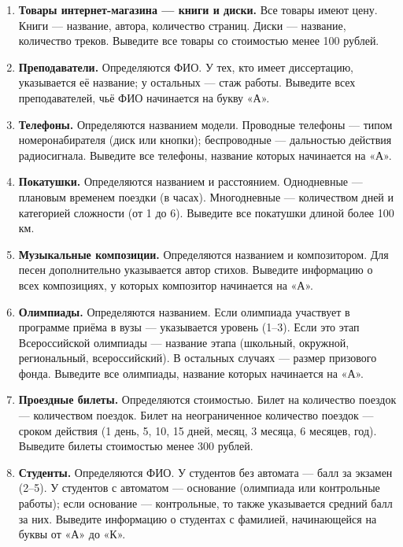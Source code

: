 \begin{enumerate}
    \item \textbf{Товары интернет-магазина — книги и диски.}  
    Все товары имеют цену. Книги — название, автора, количество страниц. Диски — название, количество треков.  
    Выведите все товары со стоимостью менее 100 рублей.

    \item \textbf{Преподаватели.}  
    Определяются ФИО. У тех, кто имеет диссертацию, указывается её название; у остальных — стаж работы.  
    Выведите всех преподавателей, чьё ФИО начинается на букву «А».

    \item \textbf{Телефоны.}  
    Определяются названием модели. Проводные телефоны — типом номеронабирателя (диск или кнопки); беспроводные — дальностью действия радиосигнала.  
    Выведите все телефоны, название которых начинается на «А».

    \item \textbf{Покатушки.}  
    Определяются названием и расстоянием. Однодневные — плановым временем поездки (в часах). Многодневные — количеством дней и категорией сложности (от 1 до 6).  
    Выведите все покатушки длиной более 100 км.

    \item \textbf{Музыкальные композиции.}  
    Определяются названием и композитором. Для песен дополнительно указывается автор стихов.  
    Выведите информацию о всех композициях, у которых композитор начинается на «А».

    \item \textbf{Олимпиады.}  
    Определяются названием. Если олимпиада участвует в программе приёма в вузы — указывается уровень (1–3). Если это этап Всероссийской олимпиады — название этапа (школьный, окружной, региональный, всероссийский). В остальных случаях — размер призового фонда.  
    Выведите все олимпиады, название которых начинается на «А».

    \item \textbf{Проездные билеты.}  
    Определяются стоимостью. Билет на количество поездок — количеством поездок. Билет на неограниченное количество поездок — сроком действия (1 день, 5, 10, 15 дней, месяц, 3 месяца, 6 месяцев, год).  
    Выведите билеты стоимостью менее 300 рублей.

    \item \textbf{Студенты.}  
    Определяются ФИО. У студентов без автомата — балл за экзамен (2–5). У студентов с автоматом — основание (олимпиада или контрольные работы); если основание — контрольные, то также указывается средний балл за них.  
    Выведите информацию о студентах с фамилией, начинающейся на буквы от «А» до «К».


\end{enumerate}
